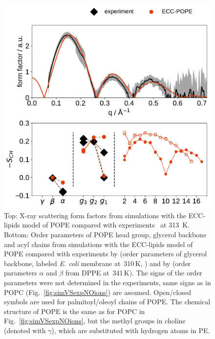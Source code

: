 \begin{figure}[tb!] 
  \centering 
  \includegraphics[width=\figwidth]{../img/ecc_pope/Order-parameters_form-factors_exp-ECC-POPE.pdf}
  \caption{\label{simVSexpNOions_POPE} 
    Top: X-ray scattering form factors from simulations with 
    the ECC-lipids model of POPE compared with experiments~\cite{kucerka11} at 313~K. 
    Bottom: Order parameters of POPE head group, glycerol backbone and acyl chains  
    from simulations with the ECC-lipids model of POPE
    compared with experiments by \citet{gally81} (order parameters of glycerol backbone, labeled \emph{E. coli} membrane at~310\,K, ) 
    and by \citet{seelig76, seelig80} (order parameters $\alpha$ and $\beta$ from DPPE at~341\,K).
    The signs of the order parameters were not determined in the experiments, same signs as in POPC (Fig.~\ref{fig:simVSexpNOions}) are assumed. 
    Open/closed symbols are used for palmitoyl/oleoyl chains of POPE. 
    The chemical structure of POPE is the same as for POPC in Fig.~\ref{fig:simVSexpNOions}, 
    but the methyl groups in choline (denoted with $\gamma$), which are substituted with hydrogen atoms in PE. 
  }  
\end{figure} 


